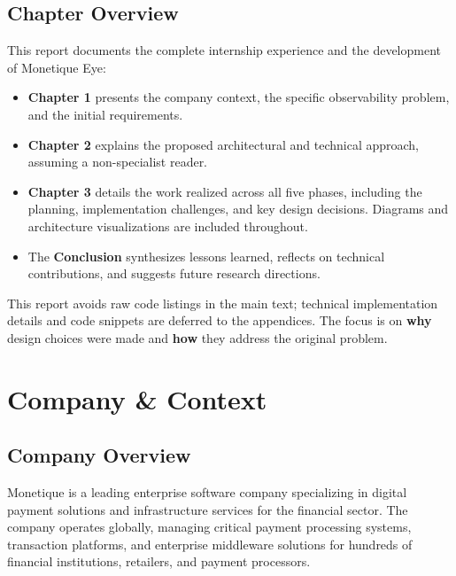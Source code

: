 \documentclass[12pt,a4paper]{report}
\begin{document}
\section*{Chapter Overview}

This report documents the complete internship experience and the development of Monetique Eye:

\begin{itemize}
  \item \textbf{Chapter 1} presents the company context, the specific observability problem, and the initial requirements.
  \item \textbf{Chapter 2} explains the proposed architectural and technical approach, assuming a non-specialist reader.
  \item \textbf{Chapter 3} details the work realized across all five phases, including the planning, implementation challenges, and key design decisions. Diagrams and architecture visualizations are included throughout.
  \item The \textbf{Conclusion} synthesizes lessons learned, reflects on technical contributions, and suggests future research directions.
\end{itemize}

This report avoids raw code listings in the main text; technical implementation details and code snippets are deferred to the appendices. The focus is on \textbf{why} design choices were made and \textbf{how} they address the original problem.

\newpage

\chapter{Company \& Context}

\section{Company Overview}

Monetique is a leading enterprise software company specializing in digital payment solutions and infrastructure services for the financial sector. The company operates globally, managing critical payment processing systems, transaction platforms, and enterprise middleware solutions for hundreds of financial institutions, retailers, and payment processors.
\end{document}
